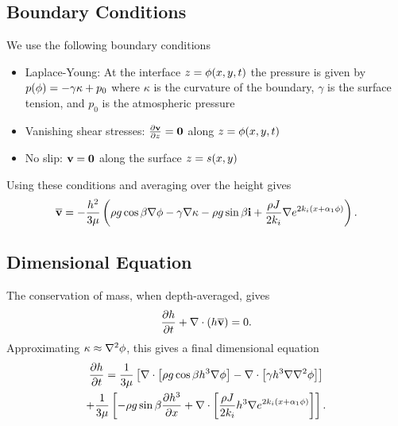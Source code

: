 \subsection{Boundary Conditions}
\begin{frame}
    We use the following boundary conditions 
    \begin{itemize}
        \item Laplace-Young: At the interface $z = \phi\!\left( x, y, t \right)$ the pressure is given by $p\!\left( \phi \right) = -\gamma \kappa + p_0$
        where $\kappa$ is the curvature of the boundary, $\gamma$ is the surface tension, and $p_0$ is the atmospheric pressure
        \item Vanishing shear stresses: $\frac{\partial \textbf{v}}{\partial z} = \textbf{0}$ along $z = \phi\!\left( x, y, t \right)$
        \item No slip: $\textbf{v} = \textbf{0}$ along the surface $z = s\!\left( x, y \right)$
    \end{itemize}

    Using these conditions and averaging over the height gives 
    \begin{equation*}
        \overline{\textbf{v}} = -\frac{h^2}{3\mu} \left( \rho g \cos\beta \nabla \phi - \gamma\nabla\kappa - \rho g \sin\beta\textbf{i} + \frac{\rho J}{2k_i}\nabla e^{2k_i \left( x + \alpha_1 \phi \right)} \right).
    \end{equation*}
\end{frame}
\subsection{Dimensional Equation}
\begin{frame}
    The conservation of mass, when depth-averaged, gives 
    \begin{equation*}\frac{\partial h}{\partial t} + \nabla \cdot \left( h\overline{\textbf{v}} \right) = 0.\end{equation*}
    Approximating $\kappa \approx \nabla^2 \phi$, this gives a final dimensional equation 
    \begin{multline}
        \frac{\partial h}{\partial t} = \frac{1}{3\mu} \left[  \nabla \cdot \left[ \rho g \cos \beta h^3 \nabla \phi \right] - \nabla \cdot \left[ \gamma h^3 \nabla\nabla^2\phi \right] \right] \\ + \frac{1}{3\mu} \left[ - \rho g \sin\beta \frac{\partial h^3}{\partial x} + \nabla \cdot \left[ \frac{\rho J}{2k_i}h^3\nabla e^{2k_i \left( x + \alpha_1 \phi \right)} \right] \right].
        \label{eq:thin_film_dim}
    \end{multline}
\end{frame}
